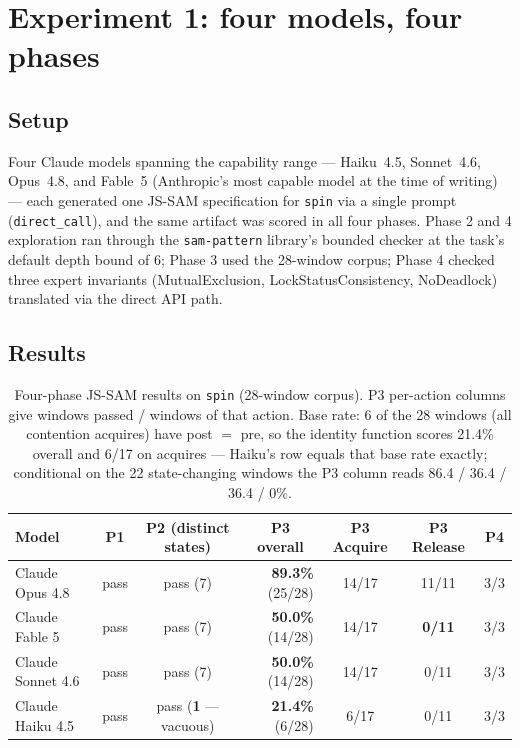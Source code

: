 \documentclass[11pt]{article}
\newcommand{\jssam}{JS-SAM}
\begin{document}
\section{Experiment 1: four models, four phases}
\label{sec:models}

\subsection{Setup}

Four Claude models spanning the capability range --- Haiku~4.5, Sonnet~4.6,
Opus~4.8, and Fable~5 (Anthropic's most capable model at the time of
writing) --- each generated one \jssam{} specification for \texttt{spin} via
a single prompt (\texttt{direct\_call}), and the same artifact was scored in
all four phases. Phase 2 and 4 exploration ran through the
\texttt{sam-pattern} library's bounded checker at the task's default depth
bound of 6; Phase 3 used the 28-window corpus; Phase 4 checked three expert
invariants (MutualExclusion, LockStatusConsistency, NoDeadlock) translated
via the direct API path.

\subsection{Results}

\begin{table}[ht]
\centering
\caption{Four-phase \jssam{} results on \texttt{spin} (28-window corpus).
P3 per-action columns give windows passed / windows of that action. Base
rate: 6 of the 28 windows (all contention acquires) have post $=$ pre, so
the identity function scores 21.4\% overall and 6/17 on acquires ---
Haiku's row equals that base rate exactly; conditional on the 22
state-changing windows the P3 column reads 86.4 / 36.4 / 36.4 / 0\%.}
\label{tab:models}
\small
\begin{tabular}{lccrccc}
\toprule
Model & P1 & P2 (distinct states) & \multicolumn{1}{c}{P3 overall} & P3 Acquire & P3 Release & P4 \\
\midrule
Claude Opus 4.8   & pass & pass (7) & \textbf{89.3\%} (25/28) & 14/17 & 11/11 & 3/3 \\
Claude Fable 5    & pass & pass (7) & \textbf{50.0\%} (14/28) & 14/17 & \textbf{0/11} & 3/3 \\
Claude Sonnet 4.6 & pass & pass (7) & \textbf{50.0\%} (14/28) & 14/17 & 0/11 & 3/3 \\
Claude Haiku 4.5  & pass & pass (\textbf{1} --- vacuous) & \textbf{21.4\%} (6/28)  & 6/17  & 0/11 & 3/3 \\
\bottomrule
\end{tabular}
\end{table}
\end{document}
